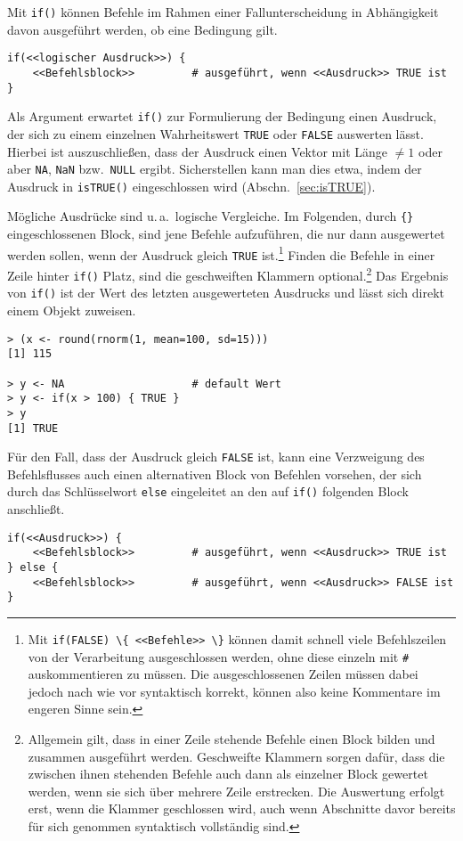 Mit \lstinline!if()! können Befehle im Rahmen einer Fallunterscheidung in Abhängigkeit davon ausgeführt werden, ob eine Bedingung gilt.
\begin{lstlisting}
if(<<logischer Ausdruck>>) {
    <<Befehlsblock>>         # ausgeführt, wenn <<Ausdruck>> TRUE ist
}
\end{lstlisting}

Als Argument erwartet \lstinline!if()! zur Formulierung der Bedingung einen Ausdruck, der sich zu einem einzelnen Wahrheitswert \lstinline!TRUE! oder \lstinline!FALSE! auswerten lässt. Hierbei ist auszuschließen, dass der Ausdruck einen Vektor mit Länge $\neq 1$ oder aber \lstinline!NA!, \lstinline!NaN! bzw.\ \lstinline!NULL! ergibt. Sicherstellen kann man dies etwa, indem der Ausdruck in \lstinline!isTRUE()! eingeschlossen wird (Abschn.\ \ref{sec:isTRUE}).

Mögliche Ausdrücke sind u.\,a.\ logische Vergleiche. Im Folgenden, durch \lstinline!{}! eingeschlossenen Block, sind jene Befehle aufzuführen, die nur dann ausgewertet werden sollen, wenn der Ausdruck gleich \lstinline!TRUE! ist.\footnote{Mit \lstinline!if(FALSE) \{ <<Befehle>> \}! können damit schnell viele Befehlszeilen von der Verarbeitung ausgeschlossen werden, ohne diese einzeln mit \lstinline!#! auskommentieren zu müssen. Die ausgeschlossenen Zeilen müssen dabei jedoch nach wie vor syntaktisch korrekt, können also keine Kommentare im engeren Sinne sein.} Finden die Befehle in einer Zeile hinter \lstinline!if()! Platz, sind die geschweiften Klammern optional.\footnote{Allgemein gilt, dass in einer Zeile stehende Befehle einen Block bilden und zusammen ausgeführt werden. Geschweifte Klammern sorgen dafür, dass die zwischen ihnen stehenden Befehle auch dann als einzelner Block gewertet werden, wenn sie sich über mehrere Zeile erstrecken. Die Auswertung erfolgt erst, wenn die Klammer geschlossen wird, auch wenn Abschnitte davor bereits für sich genommen syntaktisch vollständig sind.} Das Ergebnis von \lstinline!if()! ist der Wert des letzten ausgewerteten Ausdrucks und lässt sich direkt einem Objekt zuweisen.
\begin{lstlisting}
> (x <- round(rnorm(1, mean=100, sd=15)))
[1] 115

> y <- NA                    # default Wert
> y <- if(x > 100) { TRUE }
> y
[1] TRUE
\end{lstlisting}

Für den Fall, dass der Ausdruck gleich \lstinline!FALSE! ist, kann eine Verzweigung des Befehlsflusses auch einen alternativen Block von Befehlen vorsehen, der sich durch das Schlüsselwort \lstinline!else! eingeleitet an den auf \lstinline!if()! folgenden Block anschließt.
\begin{lstlisting}
if(<<Ausdruck>>) {
    <<Befehlsblock>>         # ausgeführt, wenn <<Ausdruck>> TRUE ist
} else {
    <<Befehlsblock>>         # ausgeführt, wenn <<Ausdruck>> FALSE ist
}
\end{lstlisting}

